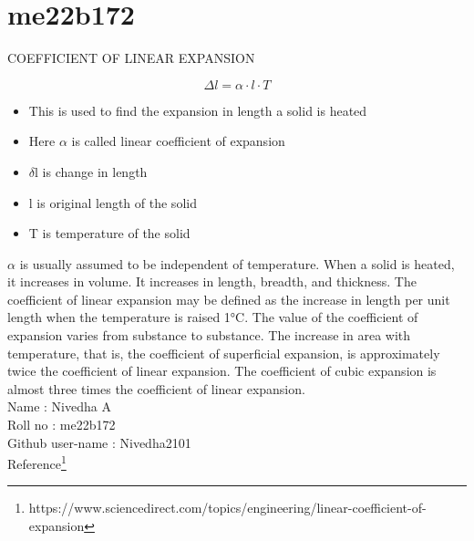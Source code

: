 \documentclass{article}
\begin{document}
\section{me22b172}
\begin{center}
    {\Large COEFFICIENT OF LINEAR EXPANSION}
\end{center}
\[\Delta l = \alpha \cdot l \cdot T\]
\begin{itemize}
    \item This is used to find the expansion in length a solid is heated
    \item Here $\alpha$ is called linear coefficient of expansion
    \item $\delta$l is change in length
    \item l is original length of the solid 
    \item T is temperature of the solid 
\end{itemize}
$\alpha$ is usually assumed to be independent of temperature. When a solid is heated, it increases in volume. It increases in length, breadth, and thickness. The coefficient of linear expansion may be defined as the increase in length per unit length when the temperature is raised 1°C. The value of the coefficient of expansion varies from substance to substance. The increase in area with temperature, that is, the coefficient of superficial expansion, is approximately twice the coefficient of linear expansion. The coefficient of cubic expansion is almost three times the coefficient of linear expansion.\\
Name : Nivedha A\\
Roll no : me22b172\\
Github user-name : Nivedha2101\\
Reference\footnote{https://www.sciencedirect.com/topics/engineering/linear-coefficient-of-expansion}
\end{document}
